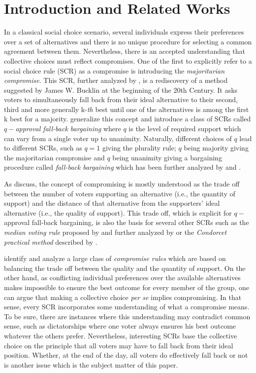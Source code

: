 \documentclass[version=3.21, pagesize, twoside=off, bibliography=totoc, DIV=calc, fontsize=12pt, a4paper]{scrartcl}
\begin{document}
\section{Introduction and Related Works}
\label{sec:introduction}
In a classical social choice scenario, several individuals express their preferences over a set of alternatives and there is no unique procedure for selecting a common agreement between them. Nevertheless, there is an accepted understanding that collective choices must reflect compromises. One of the first to explicitly refer to a social choice rule (SCR) as a compromise is \cite{Sertel1986} introducing the \textit{majoritarian compromise}. This SCR, further analyzed by \cite{Sertel1999}, is a rediscovery of a method suggested by James W. Bucklin at the beginning of the 20th Century. It asks voters to simultaneously fall back from their ideal alternative to their second, third and more generally k-\emph{th} best until one of the alternatives is among the first k best for a majority. \cite{Brams2001} generalize this concept and introduce a class of SCRs called $q-$\textit{approval fall-back bargaining }where $q$ is the level of required support which can vary from a single voter up to unanimity. Naturally, different choices of $q$ lead to different SCRs, such as $q=1$ giving the plurality rule; $q$ being majority giving the majoritarian compromise and $q$ being unanimity giving a bargaining procedure called \textit{fall-back bargaining} which has been further analyzed by \cite{Kibris2007} and \cite{Congar2012}. 

As \cite{OezkalSanver2004} discuss, the concept of compromising is mostly understood as the trade off between the number of voters supporting an alternative (i.e., the quantity of support) and the distance of that alternative from the supporters' ideal alternative (i.e., the quality of support). This trade off, which is explicit for $q-$approval fall-back bargaining, is also the basis for several other SCRs such as the \textit{median voting rule} proposed by \cite{Bassett1999} and further analyzed by \cite{Gehrlein2003} or the \textit{Condorcet practical method }described by \cite{Nurmi1999}.

\cite{Merlin2019} identify and analyze a large class of \textit{compromise rules} which are based on balancing the trade off between the quality and the quantity of support. On the other hand, as conflicting
individual preferences over the available alternatives makes impossible to ensure the best outcome for every member of the group, one can argue that making a collective choice \textit{per se} implies compromising. In that sense, every SCR incorporates some understanding of what a compromise means. To be sure, there are instances where this understanding may contradict common sense, such as dictatorships where one voter always ensures his best outcome whatever the others prefer. Nevertheless, interesting SCRs base the collective choice on the principle that all voters may have to fall back from their ideal position. Whether, at the end of the day, all voters do effectively fall back or not is another issue which is the subject matter of this paper.
\end{document}
